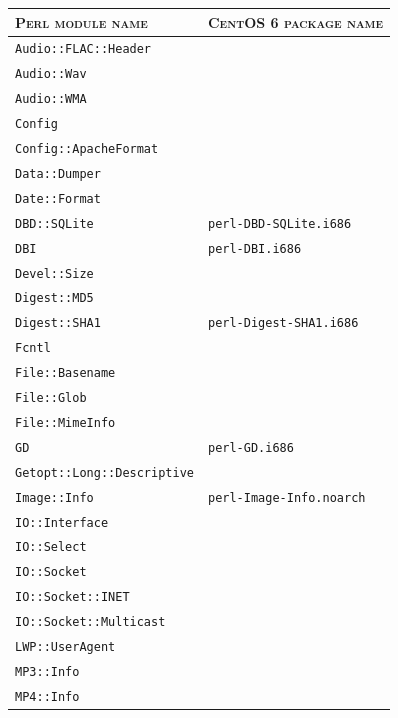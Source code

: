 \documentclass[a4paper,oneside,10pt]{report}
\begin{document}
\begin{table}
	\centering
	\begin{tabular}{|p{15em}|p{17em}|}
		\hline
		\textsc{Perl module name} 				&  \textsc{CentOS 6 package name}\\
		\hline
		\hline
		\verb|Audio::FLAC::Header| 				& \\
		\hline
		\verb|Audio::Wav| 								& \\
		\hline
		\verb|Audio::WMA| 								& \\
		\hline
		\verb|Config| 										& \\
		\hline
		\verb|Config::ApacheFormat|				& \\
		\hline
		\verb|Data::Dumper| 							& \\
		\hline
		\verb|Date::Format| 							&	\\
		\hline
		\verb|DBD::SQLite|								& \verb|perl-DBD-SQLite.i686| \\
		\hline
		\verb|DBI|												& \verb|perl-DBI.i686| \\
		\hline
		\verb|Devel::Size| 								& \\
		\hline
		\verb|Digest::MD5| 								& \\
		\hline
		\verb|Digest::SHA1| 							& \verb|perl-Digest-SHA1.i686| \\
		\hline
		\verb|Fcntl| 											& \\
		\hline
		\verb|File::Basename| 						& \\
		\hline
		\verb|File::Glob| 								& \\
		\hline
		\verb|File::MimeInfo| 						& \\
		\hline
		\verb|GD| 												& \verb|perl-GD.i686|\\
		\hline
		\verb|Getopt::Long::Descriptive| 	& \\
		\hline
		\verb|Image::Info| 								& \verb|perl-Image-Info.noarch| \\
		\hline
		\verb|IO::Interface| 							& \\
		\hline
		\verb|IO::Select| 								& \\
		\hline
		\verb|IO::Socket| 								& \\
		\hline
		\verb|IO::Socket::INET| 					& \\
		\hline
		\verb|IO::Socket::Multicast| 			& \\
		\hline
		\verb|LWP::UserAgent| 						& \\
		\hline
		\verb|MP3::Info| 									& \\
		\hline
		\verb|MP4::Info| 									& \\

\end{tabular}
\end{table}
\end{document}
